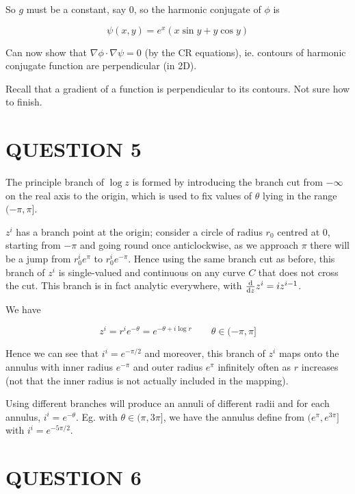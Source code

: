 \documentclass[a4paper]{article}
\begin{document}
So $ g $ must be a constant, say $ 0 $, so the harmonic conjugate of $ \phi $ is

\[ \psi(x,y) = e^{x}(x \sin y + y \cos y) \]

Can now show that $ \nabla \phi \cdot \nabla  \psi = 0 $ (by the CR equations), ie. contours of harmonic conjugate function are perpendicular (in 2D). 

Recall that a gradient of a function is perpendicular to its contours. 
Not sure how to finish.





\section{QUESTION 5}

The principle branch of $ \log z $ is formed by introducing the branch cut from $ - \infty $ on the real axis to the origin, which is used to fix values of $ \theta $ lying in the range $ (-\pi,\pi] $.

$ z^{i} $ has a branch point at the origin; consider a circle of radius $ r_{0} $ centred at $ 0 $, starting from $ -\pi $ and going round once anticlockwise, as we approach $ \pi $ there will be a jump from $ r_{0}^{i} e^{\pi} $ to $ r_{0}^{i} e^{-\pi} $. Hence using the same branch cut as before, this branch of $ z^{i} $ is single-valued and continuous on any curve $ C $ that does not cross the cut. 
This branch is in fact analytic everywhere, with $ \frac{\mathrm{d} }{\mathrm{d} z} z^{i} = i z^{i-1}  $.

We have

\[ z^{i} = r^{i}e^{-\theta} = e^{-\theta + i \log r} \qquad \theta \in (-\pi,\pi] \]

Hence we can see that  $ i^{i} = e^{-\pi/2} $ and moreover, this branch of $ z^{i} $ maps onto the annulus with inner radius $ e^{-\pi} $ and outer radius $ e^{\pi} $ infinitely often as $ r $ increases (not that the inner radius is not actually included in the mapping).

Using different branches will produce an annuli of different radii and for each annulus, $ i^{i} = e^{-\theta} $. Eg. with $ \theta \in (\pi,3\pi] $, we have the annulus define from $ (e^{\pi},e^{3\pi}] $ with $ i^{i} = e^{-5\pi/2} $.



\section{QUESTION 6}
\end{document}
